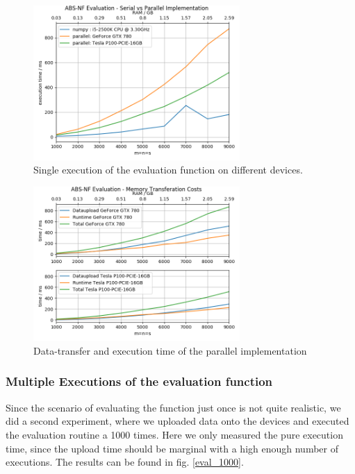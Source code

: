 \begin{figure}[ht]
	\centering
	\includegraphics[width=0.7\textwidth]{img/eval_single_repetition.png}
	\caption{Single execution of the evaluation function on different devices.}
	\label{eval_single_repetition}
\end{figure}

\begin{figure}[ht]
	\centering
	\includegraphics[width=0.7\textwidth]{img/eval_memory.png}
	\caption{Data-transfer and execution time of the parallel implementation}
	\label{eval_memory}
\end{figure}

\subsubsection{Multiple Executions of the evaluation function}

Since the scenario of evaluating the function just once is not quite realistic, we did a second experiment, where we uploaded data onto the devices and executed the evaluation routine a 1000 times. Here we only measured the pure execution time, since the upload time should be marginal with a high enough number of executions. The results can be found in fig. \ref{eval_1000}.

